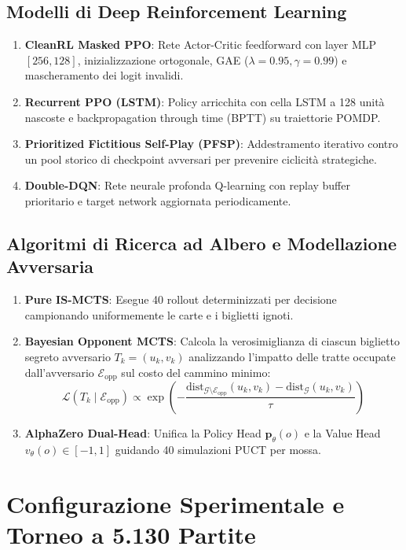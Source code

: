 \documentclass[11pt,a4paper]{article}
\begin{document}
\subsection{Modelli di Deep Reinforcement Learning}
\begin{enumerate}
    \item \textbf{CleanRL Masked PPO}: Rete Actor-Critic feedforward con layer MLP $[256, 128]$, inizializzazione ortogonale, GAE ($\lambda=0.95, \gamma=0.99$) e mascheramento dei logit invalidi.
    \item \textbf{Recurrent PPO (LSTM)}: Policy arricchita con cella LSTM a 128 unità nascoste e backpropagation through time (BPTT) su traiettorie POMDP.
    \item \textbf{Prioritized Fictitious Self-Play (PFSP)}: Addestramento iterativo contro un pool storico di checkpoint avversari per prevenire ciclicità strategiche.
    \item \textbf{Double-DQN}: Rete neurale profonda Q-learning con replay buffer prioritario e target network aggiornata periodicamente.
\end{enumerate}

\subsection{Algoritmi di Ricerca ad Albero e Modellazione Avversaria}
\begin{enumerate}
    \item \textbf{Pure IS-MCTS}: Esegue 40 rollout determinizzati per decisione campionando uniformemente le carte e i biglietti ignoti.
    \item \textbf{Bayesian Opponent MCTS}: Calcola la verosimiglianza di ciascun biglietto segreto avversario $T_k = (u_k, v_k)$ analizzando l'impatto delle tratte occupate dall'avversario $\mathcal{E}_{\text{opp}}$ sul costo del cammino minimo:
    \begin{equation}
    \mathcal{L}(T_k \mid \mathcal{E}_{\text{opp}}) \propto \exp\left( -\frac{\text{dist}_{\mathcal{G} \setminus \mathcal{E}_{\text{opp}}}(u_k, v_k) - \text{dist}_{\mathcal{G}}(u_k, v_k)}{\tau} \right)
    \end{equation}
    \item \textbf{AlphaZero Dual-Head}: Unifica la Policy Head $\mathbf{p}_\theta(o)$ e la Value Head $v_\theta(o) \in [-1, 1]$ guidando 40 simulazioni PUCT per mossa.
\end{enumerate}

\section{Configurazione Sperimentale e Torneo a 5.130 Partite}
\label{sec:esperimenti}
\end{document}
